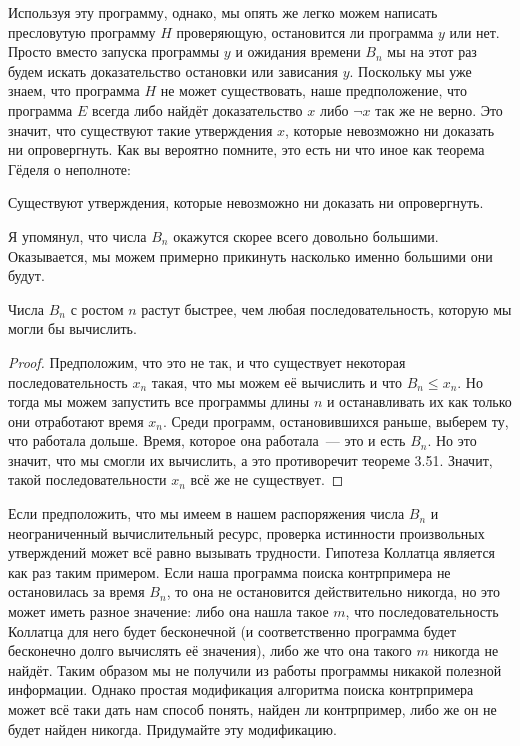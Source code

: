 Используя эту программу, однако, мы опять же легко можем написать пресловутую программу $H$ проверяющую, остановится ли программа $y$ или нет. Просто вместо запуска программы $y$ и ожидания времени $B_n$ мы на этот раз будем искать доказательство остановки или зависания $y$. Поскольку мы уже знаем, что программа $H$ не может существовать, наше предположение, что программа $E$ всегда либо найдёт доказательство $x$ либо $\neg x$ так же не верно. Это значит, что существуют такие утверждения $x$, которые невозможно ни доказать ни опровергнуть. Как вы вероятно помните, это есть ни что иное как теорема Гёделя о неполноте:

\begin{thm}
Существуют утверждения, которые невозможно ни доказать ни опровергнуть.
\end{thm}

Я упомянул, что числа $B_n$ окажутся скорее всего довольно большими. Оказывается, мы можем примерно прикинуть насколько именно большими они будут.

\begin{thm}
Числа $B_n$ с ростом $n$ растут быстрее, чем любая последовательность, которую мы могли бы вычислить.
\end{thm}
\begin{proof}
Предположим, что это не так, и что существует некоторая последовательность $x_n$ такая, что мы можем её вычислить и что $B_n\le x_n$. Но тогда мы можем запустить все программы длины $n$ и останавливать их как только они отработают время $x_n$. Среди программ, остановившихся раньше, выберем ту, что работала дольше. Время, которое она работала~— это и есть $B_n$. Но это значит, что мы смогли их вычислить, а это противоречит теореме 3.51. Значит, такой последовательности $x_n$ всё же не существует.
\end{proof}

\begin{exercise}
Если предположить, что мы имеем в нашем распоряжения числа $B_n$ и неограниченный вычислительный ресурс, проверка истинности произвольных утверждений может всё равно вызывать трудности. Гипотеза Коллатца является как раз таким примером. Если наша программа поиска контрпримера не остановилась за время $B_n$, то она не остановится действительно никогда, но это может иметь разное значение: либо она нашла такое $m$, что последовательность Коллатца для него будет бесконечной (и соответственно программа будет бесконечно долго вычислять её значения), либо же что она такого $m$ никогда не найдёт. Таким образом мы не получили из работы программы никакой полезной информации. Однако простая модификация алгоритма поиска контрпримера может всё таки дать нам способ понять, найден ли контрпример, либо же он не будет найден никогда. Придумайте эту модификацию.
\end{exercise}

